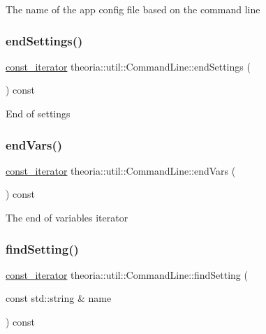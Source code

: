 The name of the app config file based on the command line \mbox{\label{classtheoria_1_1util_1_1CommandLine_ae33c86c2a60d2470827b2206893c8f7b}} 
\subsubsection{\texorpdfstring{end\+Settings()}{endSettings()}}
{\footnotesize\ttfamily \hyperlink{classtheoria_1_1util_1_1CommandLine_a729aa00feedd8257d4caafc73ac6ee63}{const\+\_\+iterator} theoria\+::util\+::\+Command\+Line\+::end\+Settings (\begin{DoxyParamCaption}{ }\end{DoxyParamCaption}) const\hspace{0.3cm}{\ttfamily [inline]}}

End of settings \mbox{\label{classtheoria_1_1util_1_1CommandLine_add5993c46a68548f70a75b2eb9431558}} 
\subsubsection{\texorpdfstring{end\+Vars()}{endVars()}}
{\footnotesize\ttfamily \hyperlink{classtheoria_1_1util_1_1CommandLine_a729aa00feedd8257d4caafc73ac6ee63}{const\+\_\+iterator} theoria\+::util\+::\+Command\+Line\+::end\+Vars (\begin{DoxyParamCaption}{ }\end{DoxyParamCaption}) const\hspace{0.3cm}{\ttfamily [inline]}}

The end of variables iterator \mbox{\label{classtheoria_1_1util_1_1CommandLine_abb86432416368ace970920f3fc4fe9c6}} 
\subsubsection{\texorpdfstring{find\+Setting()}{findSetting()}}
{\footnotesize\ttfamily \hyperlink{classtheoria_1_1util_1_1CommandLine_a729aa00feedd8257d4caafc73ac6ee63}{const\+\_\+iterator} theoria\+::util\+::\+Command\+Line\+::find\+Setting (\begin{DoxyParamCaption}\item[{const std\+::string \&}]{name }\end{DoxyParamCaption}) const\hspace{0.3cm}{\ttfamily [inline]}}

